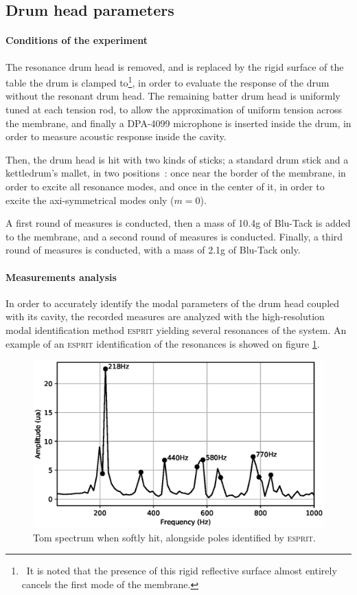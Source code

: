\documentclass[11pt, twocolumn]{article}
\begin{document}
\subsection{Drum head parameters}

\paragraph{Conditions of the experiment}
The resonance drum head is removed, and is replaced by the rigid surface of the table the drum is clamped to\footnote{~It is noted that the presence of this rigid reflective surface almost entirely cancels the first mode of the membrane.}, in order to evaluate the response of the drum without the resonant drum head. The remaining batter drum head is uniformly tuned at each tension rod, to allow the approximation of uniform tension across the membrane, and finally a DPA-4099 microphone is inserted inside the drum, in order to measure acoustic response inside the cavity.

Then, the drum head is hit with two kinds of sticks; a standard drum stick and a kettledrum's mallet, in two positions~: once near the border of the membrane, in order to excite all resonance modes, and once in the center of it, in order to excite the axi-symmetrical modes only ($m = 0$).

A first round of measures is conducted, then a mass of 10.4g of Blu-Tack is added to the membrane, and a second round of measures is conducted. Finally, a third round of measures is conducted, with a mass of 2.1g of Blu-Tack only. 

\paragraph{Measurements analysis}
In order to accurately identify the modal parameters of the drum head coupled with its cavity, the recorded measures are analyzed with the high-resolution modal identification method \textsc{esprit} \cite{ESPRIT} yielding several resonances of the system. An example of an \textsc{esprit} identification of the resonances is showed on figure \ref{fig:ident_esprit_tom}.

\begin{figure}[!h]
    \centering
    \includegraphics[width=\linewidth]{identification_esprit_tom.eps}
    \caption{Tom spectrum when softly hit, alongside poles identified by \textsc{esprit}.}
    \label{fig:ident_esprit_tom}
\end{figure}
\end{document}
